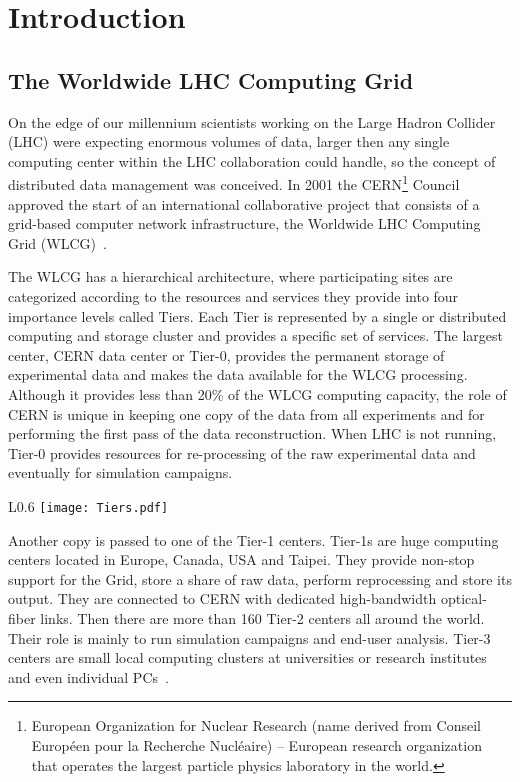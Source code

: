 \chapter*{Introduction}

\section*{The Worldwide LHC Computing Grid}
On the edge of our millennium scientists working on the Large Hadron Collider (LHC) were expecting enormous volumes 
of data, larger then any single computing center within the LHC collaboration could handle, so the concept of 
distributed data management was conceived. In 2001 the CERN\footnote{European Organization for Nuclear Research 
(name derived from Conseil Européen pour la Recherche Nucléaire) -- European research organization that operates 
the largest particle physics laboratory in the world.} Council approved the start of an international 
collaborative project that consists of a grid-based computer network infrastructure, the Worldwide LHC Computing 
Grid (WLCG)~\cite{happyBday}. 

The WLCG has a hierarchical architecture, where participating sites are categorized according to the resources and 
services they provide into four importance levels called Tiers. Each Tier is represented by a single or 
distributed computing and storage cluster and provides a specific set of services. The largest center, CERN data 
center or Tier-0, provides the  permanent storage of experimental data and makes the data available for the WLCG 
processing. Although it provides less than 20\% of the WLCG computing capacity, the role of CERN is unique in 
keeping one copy of the data from all experiments and for performing the first pass of the data reconstruction. 
When LHC is not running, Tier-0 provides resources for re-processing of the raw experimental data and eventually 
for simulation campaigns. 

\begin{wrapfigure}{L}{0.6\textwidth}
\centering
\texttt{[image: Tiers.pdf]}
\caption{The WLCG Tier-1 centers with CERN Tier-0 in the middle}
\label{fig:WLCG}
\end{wrapfigure}

Another copy is passed to one of the Tier-1 centers. Tier-1s are huge computing centers located in Europe, Canada, USA 
and Taipei. They provide non-stop support for the Grid, store a share of raw data, perform reprocessing and store 
its output. They are connected to CERN with dedicated high-bandwidth optical-fiber links. Then there are more than 
160 Tier-2 centers all around the world. Their role is mainly to run simulation campaigns and end-user analysis. 
Tier-3 centers are small local computing clusters at universities or research institutes and even individual 
PCs~\cite{TGrid}.

